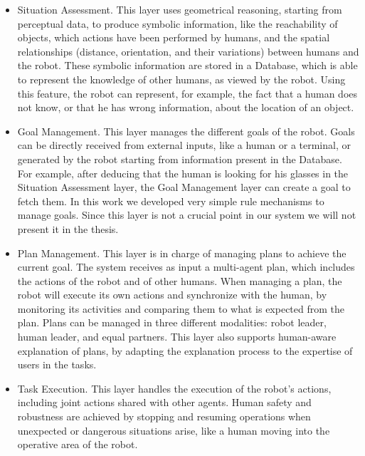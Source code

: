 \begin{itemize}
\item Situation Assessment. This layer uses geometrical reasoning, starting from perceptual data, to produce symbolic information, like the reachability of objects, which actions have been performed by humans, and the spatial relationships (distance, orientation, and their variations) between humans and the robot. These symbolic information are stored in a Database, which is able to represent the knowledge of other humans, as viewed by the robot. Using this feature, the robot can represent, for example, the fact that a human does not know, or that he has wrong information, about the location of an object. 
\item Goal Management. This layer manages the different goals of the robot. Goals can be directly received from external inputs, like a human or a terminal, or generated by the robot starting from information present in the Database. For example, after deducing that the human is looking for his glasses in the Situation Assessment layer, the Goal Management layer can create a goal to fetch them. In this work we developed very simple rule mechanisms to manage goals. Since this layer is not a crucial point in our system we will not present it in the thesis.
\item Plan Management. This layer is in charge of managing plans to achieve the current goal. The system receives as input a multi-agent plan, which includes the actions of the robot and of other humans. When managing a plan, the robot will execute its own actions and synchronize with the human, by monitoring its activities and comparing them to what is expected from the plan.
Plans can be managed in three different modalities: robot leader, human leader, and equal partners.  This layer also supports human-aware explanation of plans, by adapting the explanation process to the expertise of users in the tasks. 
\item Task Execution. This layer handles the execution of the robot's actions, including joint actions shared with other agents. Human safety and robustness are achieved by stopping and resuming operations  when unexpected or dangerous situations arise, like a human moving into the operative area of the robot.
\end{itemize}


